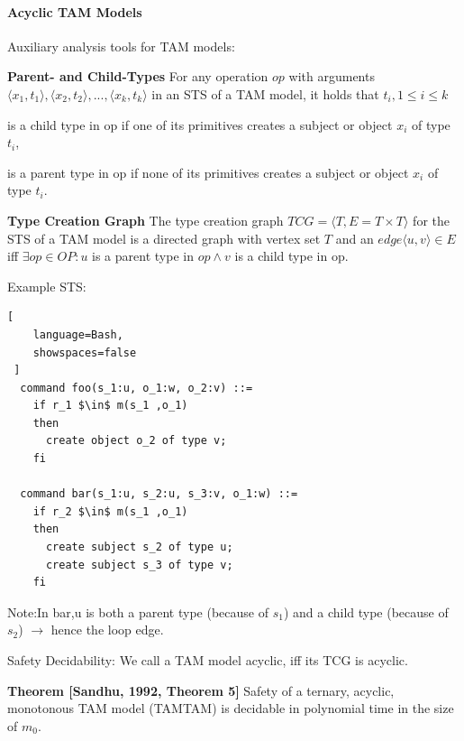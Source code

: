\documentclass[a4paper]{article}
\renewcommand{\note}[2]{\begin{noteBox} \textbf{#1} #2 \end{noteBox}}
\begin{document}
\begin{multicols}{3}
    \paragraph{Acyclic TAM Models}
    Auxiliary analysis tools for TAM models:

    \note{Parent- and Child-Types}{For any operation $op$ with arguments $⟨x_1,t_1⟩,⟨x_2,t_2⟩,...,⟨x_k,t_k⟩$ in an STS of a TAM model, it holds that $t_i, 1\leq i\leq k$
        \begin{itemize*}
            \item is a child type in op if one of its primitives creates a subject or object $x_i$ of type $t_i$,
            \item is a parent type in op if none of its primitives creates a subject or object $x_i$ of type $t_i$.
        \end{itemize*}
    }

    \note{Type Creation Graph}{The type creation graph $TCG=⟨T,E=T\times T⟩$ for the STS of a TAM model is a directed graph with vertex set $T$ and an $edge⟨u,v⟩\in E$ iff $\exists op\in OP:u$ is a parent type in $op\wedge v$ is a child type in op.}

    Example STS:
    \begin{lstlisting}[
    language=Bash,
    showspaces=false
 ]
  command foo(s_1:u, o_1:w, o_2:v) ::=
    if r_1 $\in$ m(s_1 ,o_1)
    then
      create object o_2 of type v;
    fi
  
  command bar(s_1:u, s_2:u, s_3:v, o_1:w) ::=
    if r_2 $\in$ m(s_1 ,o_1)
    then
      create subject s_2 of type u;
      create subject s_3 of type v;
    fi
  \end{lstlisting}

    Note:In bar,u is both a parent type (because of $s_1$) and a child type (because of $s_2$) $\rightarrow$  hence the loop edge.

    Safety Decidability: We call a TAM model acyclic, iff its TCG is acyclic.

    \note{Theorem [Sandhu, 1992, Theorem 5]}{Safety of a ternary, acyclic, monotonous TAM model (TAMTAM) is decidable in polynomial time in the size of $m_0$.}


\end{multicols}
\end{document}
